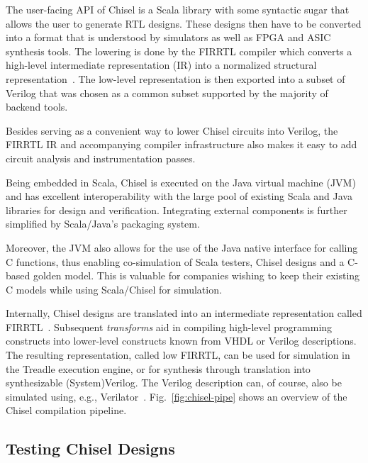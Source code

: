 \documentclass[conference]{IEEEtran}
\begin{document}
The user-facing API of Chisel is a Scala library with some syntactic sugar that allows the user to generate RTL designs.
These designs then have to be converted into a format that is understood by simulators as well as FPGA and ASIC synthesis tools.
The lowering is done by the FIRRTL compiler which converts a high-level intermediate representation (IR) into a normalized structural representation~\cite{firrtl}.
The low-level representation is then exported into a subset of Verilog that was chosen as a common subset supported by the majority of backend tools.

Besides serving as a convenient way to lower Chisel circuits into Verilog, the FIRRTL IR and accompanying compiler infrastructure
also makes it easy to add circuit analysis and instrumentation passes.

Being embedded in Scala, Chisel is executed on the Java virtual machine (JVM) and has excellent 
interoperability with the large pool of existing Scala and Java libraries for design and verification. 
Integrating external components is further simplified by Scala/Java's packaging system.

Moreover, the JVM also allows for the use of the Java native interface for calling C functions, 
thus enabling co-simulation of Scala testers, Chisel designs and a C-based golden model. This is 
valuable for companies wishing to keep their existing C models while using Scala/Chisel for simulation.

Internally, Chisel designs are translated into an intermediate representation called 
FIRRTL~\cite{firrtl}. Subsequent \textit{transforms} aid in compiling high-level programming 
constructs into lower-level constructs known from VHDL or Verilog descriptions. The resulting 
representation, called low FIRRTL, can be used for simulation in the Treadle execution 
engine, or for synthesis through translation into synthesizable (System)Verilog. The 
Verilog description can, of course, also be simulated using, e.g., Verilator~\cite{verilator}. 
Fig.~\ref{fig:chisel-pipe} shows an overview of the Chisel compilation pipeline.

\subsection{Testing Chisel Designs}
\end{document}
